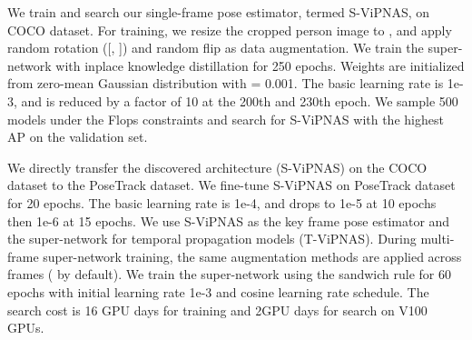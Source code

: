 \documentclass[final]{cvpr}
\begin{document}
We train and search our single-frame pose estimator, termed S-ViPNAS, on COCO dataset. 
For training, we resize the cropped person image to , and apply random rotation ([, ]) and random flip as data augmentation. We train the super-network with inplace knowledge distillation for 250 epochs. Weights are initialized from zero-mean Gaussian distribution with  = 0.001. The basic learning rate is 1e-3, and is reduced by a factor of 10 at the 200th and 230th epoch. We sample 500 models under the Flops constraints and search for S-ViPNAS with the highest AP on the validation set. 


We directly transfer the discovered architecture (S-ViPNAS) on the COCO dataset to the PoseTrack dataset. We fine-tune S-ViPNAS on PoseTrack dataset for 20 epochs. The basic learning rate is 1e-4, and drops to 1e-5 at 10 epochs then 1e-6 at 15 epochs. We use S-ViPNAS as the key frame pose estimator and the super-network for temporal propagation models (T-ViPNAS). 
During multi-frame super-network training, the same augmentation methods are applied across  frames ( by default). We train the super-network using the sandwich rule for 60 epochs with initial learning rate 1e-3 and cosine learning rate schedule. The search cost is 16 GPU days for training and 2GPU days for search on V100 GPUs.
\end{document}
